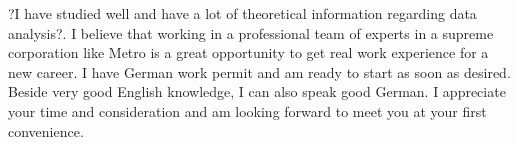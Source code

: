 \documentclass[11pt,a4paper,sans]{moderncv}        %
\begin{document}
?I have studied well and have a lot of theoretical information regarding data analysis?. I believe that working in a professional team of experts in a supreme corporation like Metro is a great opportunity to get real work experience for a new career. I have German work permit and am ready to start as soon as desired. Beside very good English knowledge, I can also speak good German. 
 I appreciate your time and consideration and am looking forward to meet you at your first convenience.
 \vspace{3mm}
 
\makeletterclosing
\end{document}
